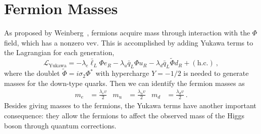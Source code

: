 \section{Fermion Masses}
\label{sec:fermionmasses}
As proposed by Weinberg~\cite{PhysRevLett.19.1264}, fermions acquire
mass through interaction with the $\Phi$ field, which has a nonzero
vev. This is accomplished by adding Yukawa terms to the Lagrangian for
each generation,
\begin{equation}
\mathcal L_{\mathrm{Yukawa}} = - \lambda_e \bar\ell_L\Phi e_R -
\lambda_u\bar q_L\Phi u_R  - \lambda_d\bar q_L\tilde\Phi d_R + (\mathrm{h.c.})~,
\end{equation}
where the doublet $\tilde\Phi = i\sigma_2\Phi^{\ast}$ with hypercharge $Y=-1/2$ is
needed to generate masses for the down-type quarks. Then we can
identify the fermion masses as
\begin{align}
m_e &= \frac{\lambda_e v}{2}&m_u &= \frac{\lambda_u
                                          v}{2}& m_d &= \frac{\lambda_dv}{2}~.
\end{align}
Besides giving masses to the fermions, the Yukawa terms have another important
consequence: they allow the fermions to affect the
observed mass of the Higgs boson through quantum corrections.

